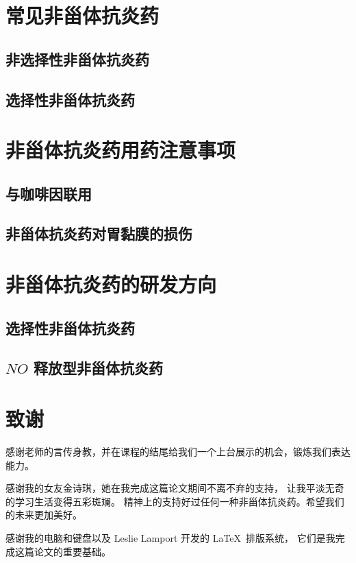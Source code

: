 \documentclass[12pt, a4paper, oneside]{ctexart}
\begin{document}
\newpage
\section{常见非甾体抗炎药}
\subsection{非选择性非甾体抗炎药}

\subsection{选择性非甾体抗炎药}


\newpage
\section{非甾体抗炎药用药注意事项}
\subsection{与咖啡因联用}

\subsection{非甾体抗炎药对胃黏膜的损伤}


\newpage
\section{非甾体抗炎药的研发方向}
\subsection{选择性非甾体抗炎药}

\subsection{$NO$ 释放型非甾体抗炎药}


\newpage
\section*{致谢}
感谢老师的言传身教，并在课程的结尾给我们一个上台展示的机会，锻炼我们表达能力。

感谢我的女友金诗琪，她在我完成这篇论文期间不离不弃的支持，
让我平淡无奇的学习生活变得五彩斑斓。
精神上的支持好过任何一种非甾体抗炎药。希望我们的未来更加美好。

感谢我的电脑和键盘以及 Leslie Lamport 开发的 \LaTeX \ 排版系统，
它们是我完成这篇论文的重要基础。
\end{document}
